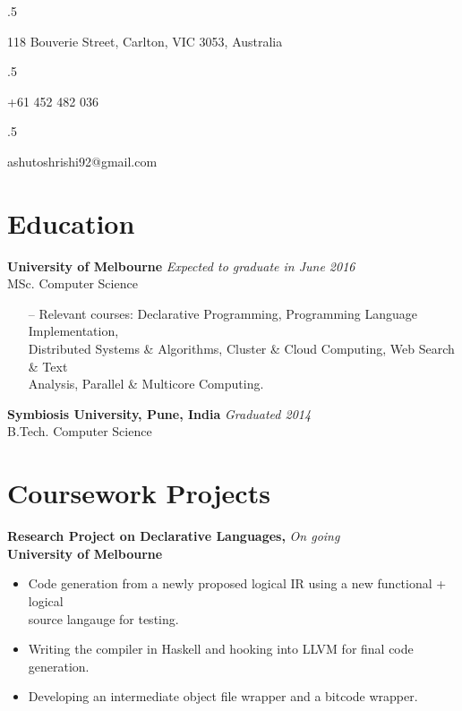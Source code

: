 \documentclass[a4paper,overlapped]{res}
\begin{document}


\begin{resume}
  \moveleft.5\hoffset\centerline{118 Bouverie Street, Carlton, VIC 3053, Australia}
  \moveleft.5\hoffset\centerline{+61 452 482 036}
  \moveleft.5\hoffset\centerline{ashutoshrishi92@gmail.com}

  \section{Education}  
  \textbf{University of Melbourne} \hfill \textit{Expected to graduate in June 2016} \\
  MSc. Computer Science 
  \begin{itemize} \itemsep -2pt
  \item[--] Relevant courses: Declarative Programming, 
    Programming Language Implementation, \\ Distributed Systems \&
    Algorithms, Cluster \& Cloud Computing, Web Search \& Text \\ 
    Analysis, Parallel \& Multicore Computing.
  \end{itemize}

  \textbf{Symbiosis University, Pune, India} \hfill \textit{Graduated 2014} \\
  B.Tech. Computer Science 


  \section{Coursework Projects}
  
  \textbf{Research Project on Declarative Languages,} \hfill \textit{On going}\\
  \textbf{University of Melbourne}
  \begin{itemize}
  \item Code generation from a newly proposed logical IR using a new
    functional + logical\\ source langauge for testing.
  \item Writing the compiler in Haskell and hooking into LLVM for final code
    generation.
  \item Developing an intermediate object file wrapper and a bitcode wrapper.

  \end{itemize}


\end{resume}
\end{document}
